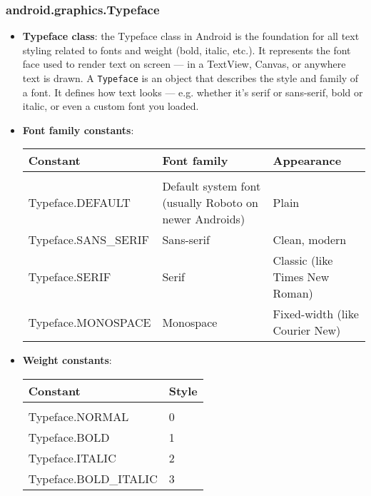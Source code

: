 \documentclass{report}
\begin{document}
    \subsubsection{android.graphics.Typeface}
    \begin{itemize}
        \item \textbf{Typeface class}: the Typeface class in Android is the foundation for all text styling related to fonts and weight (bold, italic, etc.). It represents the font face used to render text on screen — in a TextView, Canvas, or anywhere text is drawn.
            \bigbreak \noindent 
            A \texttt{Typeface} is an object that describes the style and family of a font. It defines how text looks — e.g. whether it’s serif or sans-serif, bold or italic, or even a custom font you loaded.
        \item \textbf{Font family constants}:
            \bigbreak \noindent 
            \begin{center}
                \begin{tabular}{p{4cm}|p{4cm}|p{4cm}}
                    Constant	&Font family	&Appearance \\
                    \hline \\[0.01cm]
                    Typeface.DEFAULT	&Default system font (usually Roboto on newer Androids)	&Plain \\[2ex]
                    Typeface.SANS\_SERIF	&Sans-serif	&Clean, modern \\[2ex]
                    Typeface.SERIF	&Serif	&Classic (like Times New Roman) \\[2ex]
                    Typeface.MONOSPACE	&Monospace	&Fixed-width (like Courier New)
                \end{tabular}
            \end{center}
        \item \textbf{Weight constants}:
            \bigbreak \noindent 
            \begin{center}
                \begin{tabular}{p{4cm}|p{1cm}}
                    Constant	&Style \\ 
                    \hline \\[0.01cm]
                    Typeface.NORMAL	&0 \\[2ex]
                    Typeface.BOLD	&1 \\[2ex]
                    Typeface.ITALIC	&2 \\[2ex]
                    Typeface.BOLD\_ITALIC	&3

\end{tabular}
\end{center}
\end{itemize}
\end{document}
